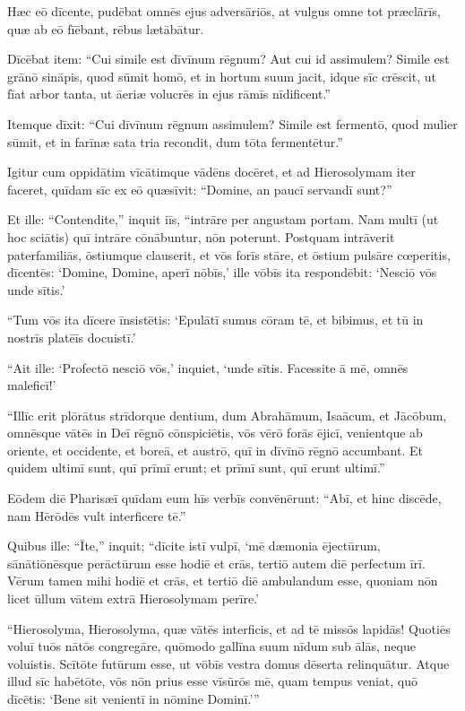 \Versus Hæc eō dīcente, pudēbat omnēs ejus adversāriōs, at vulgus omne tot præclārīs, quæ ab eō fīēbant, rēbus lætābātur.

\Versus Dīcēbat item: ``Cui simile est dīvīnum rēgnum? Aut cui id assimulem?
\Versus Simile est grānō sināpis, quod sūmit homō, et in hortum suum jacit, idque sīc crēscit, ut fīat arbor tanta, ut āeriæ volucrēs in ejus rāmīs nīdificent.''

\Versus Itemque dīxit: ``Cui dīvīnum rēgnum assimulem?
\Versus Simile est fermentō, quod mulier sūmit, et in farīnæ sata tria recondit, dum tōta fermentētur.''

\Versus Igitur cum oppidātim vīcātimque vādēns docēret, et ad Hierosolymam iter faceret,
\Versus quīdam sīc ex eō quæsīvit: ``Domine, an paucī servandī sunt?''

\Versus Et ille: ``Contendite,'' inquit iīs, ``intrāre per angustam portam. Nam multī (ut hoc sciātis) quī intrāre cōnābuntur, nōn poterunt.
\Versus Postquam intrāverit paterfamiliās, ōstiumque clauserit, et vōs forīs stāre, et ōstium pulsāre cœperitis, dīcentēs: `Domine, Domine, aperī nōbīs,' ille vōbīs ita respondēbit: `Nesciō vōs unde sītis.'

\Versus ``Tum vōs ita dīcere īnsistētis: `Epulātī sumus cōram tē, et bibimus, et tū in nostrīs platēīs docuistī.'

\Versus ``Ait ille: `Profectō nesciō vōs,' inquiet, `unde sītis. Facessite ā mē, omnēs maleficī!'

\Versus ``Illīc erit plōrātus strīdorque dentium, dum Abrahāmum, Isaācum, et Jācōbum, omnēsque vātēs in Deī rēgnō cōnspiciētis, vōs vērō forās ējicī,
\Versus venientque ab oriente, et occidente, et boreā, et austrō, quī in dīvīnō rēgnō accumbant.
\Versus Et quidem ultimī sunt, quī prīmī erunt; et prīmī sunt, quī erunt ultimī.''

\Versus Eōdem diē Pharisæī quīdam eum hīs verbīs convēnērunt: ``Abī, et hinc discēde, nam Hērōdēs vult interficere tē.''

\Versus Quibus ille: ``Īte,'' inquit; ``dīcite istī vulpī, `mē dæmonia ējectūrum, sānātiōnēsque perāctūrum esse hodiē et crās, tertiō autem diē perfectum īrī.
\Versus Vērum tamen mihi hodiē et crās, et tertiō diē ambulandum esse, quoniam nōn licet ūllum vātem extrā Hierosolymam perīre.'

\Versus ``Hierosolyma, Hierosolyma, quæ vātēs interficis, et ad tē missōs lapidās! Quotiēs voluī tuōs nātōs congregāre, quōmodo gallīna suum nīdum sub ālās, neque voluistis.
\Versus Scītōte futūrum esse, ut vōbīs vestra domus dēserta relinquātur. Atque illud sīc habētōte, vōs nōn prius esse vīsūrōs mē, quam tempus veniat, quō dīcētis: `Bene sit venientī in nōmine Dominī.'{}''
